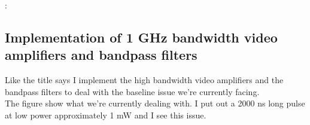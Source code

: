 \documentclass[10pt]{book}
\begin{document}
{\begin{minipage}{0.5\linewidth}
\hrulefill 

{\color{red}{\tiny file:}:}\begin{tiny}\end{tiny} 

\hrulefill

\end{minipage}}

\subsection{Implementation of 1 GHz bandwidth video amplifiers and bandpass filters}
Like the title says I implement the high bandwidth video amplifiers and the bandpass filters to deal with the baseline issue we're currently facing. \\

The figure show what we're currently dealing with. I put out a 2000 ns long pulse at low power approximately 1 mW and I see this issue.\\
\end{document}
